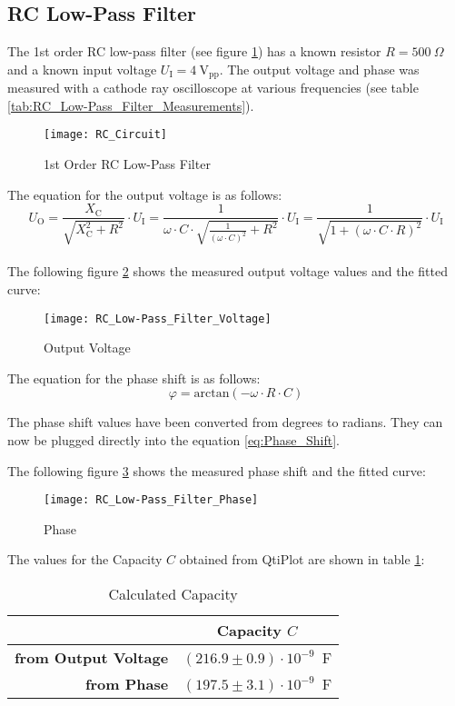 \subsection{RC Low-Pass Filter}
\label{subsec:RC_Low-Pass_Filter}
The 1st order RC low-pass filter (see figure \ref{fig:1st_Order_RC_Low-Pass_Filter}) has a known resistor $R = 500\ \Omega$ and a known input voltage $U_{\text{I}}=4\ \text{V}_{\text{pp}}$. The output voltage and phase was measured with a cathode ray oscilloscope at various frequencies (see table \ref{tab:RC_Low-Pass_Filter_Measurements}).
\begin{figure}[H]
	\centering
	\texttt{[image: RC\_Circuit]}
	\caption{1st Order RC Low-Pass Filter}
	\label{fig:1st_Order_RC_Low-Pass_Filter}
\end{figure}
The equation for the output voltage is as follows:
\begin{equation}
U_{\text{O}}=\frac{X_{\text{C}}}{\sqrt{X_{\text{C}}^2+R^2}}\cdot U_{\text{I}}=\frac{1}{\omega\cdot C\cdot\sqrt{\frac{1}{(\omega\cdot C)^2}+R^2}}\cdot U_{\text{I}}=\frac{1}{\sqrt{1+(\omega\cdot C\cdot R)^2}}\cdot U_{\text{I}}
\end{equation}
\\
The following figure \ref{fig:Output_Voltage} shows the measured output voltage values and the fitted curve:
\begin{figure}[H]
	\centering
	\texttt{[image: RC\_Low-Pass\_Filter\_Voltage]}
	\caption{Output Voltage}
	\label{fig:Output_Voltage}
\end{figure}
\newpage
The equation for the phase shift is as follows:
\begin{equation}
\varphi=\text{arctan}(-\omega\cdot R\cdot C)
\label{eq:Phase_Shift}
\end{equation}

The phase shift values have been converted from degrees to radians. They can now be plugged directly into the equation \ref{eq:Phase_Shift}.

The following figure \ref{fig:Phase} shows the measured phase shift and the fitted curve:
\begin{figure}[H]
	\centering
	\texttt{[image: RC\_Low-Pass\_Filter\_Phase]}
	\caption{Phase}
	\label{fig:Phase}
\end{figure}
The values for the Capacity $C$ obtained from QtiPlot are shown in table \ref{tab:Calculated_RC_Calculated_Capacity}:
\begin{table}[H]
	\centering
	\renewcommand{\arraystretch}{1.3}
	\begin{tabular}{r|c}
		& \textbf{Capacity $C$} \\
		\hline\hline
		\textbf{from Output Voltage} & $(216.9\pm0.9)\cdot10^{-9}$\ F \\
		\textbf{from Phase} & $(197.5\pm3.1)\cdot10^{-9}$\ F \\
	\end{tabular}
	\caption{Calculated Capacity}
	\label{tab:Calculated_RC_Calculated_Capacity}
\end{table}
